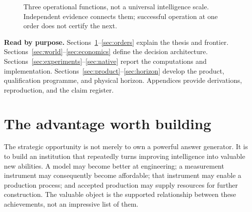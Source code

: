 \documentclass[11pt,letterpaper]{article}
\theoremstyle{remark}\newtheorem{remark}{Remark}[section]
\begin{document}
\begin{figure}[H]
\centering
{}
\caption{Three operational functions, not a universal intelligence scale. Independent evidence connects them; successful operation at one order does not certify the next.}
\end{figure}
\textbf{Read by purpose.} Sections~\ref{sec:thesis}--\ref{sec:orders} explain the thesis and frontier. Sections~\ref{sec:world}--\ref{sec:economics} define the decision architecture. Sections~\ref{sec:experiments}--\ref{sec:native} report the computations and implementation. Sections~\ref{sec:product}--\ref{sec:horizon} develop the product, qualification programme, and physical horizon. Appendices provide derivations, reproduction, and the claim register.

\clearpage
\tableofcontents
\clearpage

\section{The advantage worth building}\label{sec:thesis}
The strategic opportunity is not merely to own a powerful answer generator. It is to build an institution that repeatedly turns improving intelligence into valuable new abilities. A model may become better at engineering; a measurement instrument may consequently become affordable; that instrument may enable a production process; and accepted production may supply resources for further construction. The valuable object is the supported relationship between these achievements, not an impressive list of them.
\end{document}
